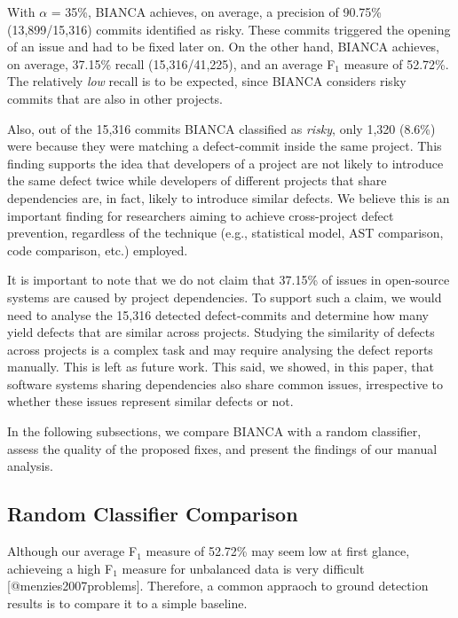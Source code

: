 With \(\alpha\) = 35\%, BIANCA achieves, on average, a precision of
90.75\% (13,899/15,316) commits identified as risky. These commits
triggered the opening of an issue and had to be fixed later on. On the
other hand, BIANCA achieves, on average, 37.15\% recall (15,316/41,225),
and an average F\(_1\) measure of 52.72\%. The relatively \emph{low}
recall is to be expected, since BIANCA considers risky commits that are
also in other projects.

Also, out of the 15,316 commits BIANCA classified as \emph{risky}, only
1,320 (8.6\%) were because they were matching a defect-commit inside the
same project. This finding supports the idea that developers of a
project are not likely to introduce the same defect twice while
developers of different projects that share dependencies are, in fact,
likely to introduce similar defects. We believe this is an important
finding for researchers aiming to achieve cross-project defect
prevention, regardless of the technique (e.g., statistical model, AST
comparison, code comparison, etc.) employed.

It is important to note that we do not claim that 37.15\% of issues in
open-source systems are caused by project dependencies. To support such
a claim, we would need to analyse the 15,316 detected defect-commits and
determine how many yield defects that are similar across projects.
Studying the similarity of defects across projects is a complex task and
may require analysing the defect reports manually. This is left as
future work. This said, we showed, in this paper, that software systems
sharing dependencies also share common issues, irrespective to whether
these issues represent similar defects or not.

In the following subsections, we compare BIANCA with a random
classifier, assess the quality of the proposed fixes, and present the
findings of our manual analysis.

\subsection{Random Classifier
Comparison}\label{random-classifier-comparison}

Although our average F\(_1\) measure of 52.72\% may seem low at first
glance, achieveing a high F\(_1\) measure for unbalanced data is very
difficult {[}@menzies2007problems{]}. Therefore, a common appraoch to
ground detection results is to compare it to a simple baseline.

